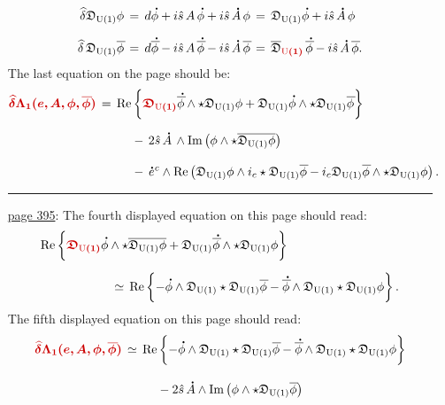 \documentclass[12pt]{GeomPhysBOOK}
\newcommand\mcorrect[1]{{\color{red!80!black}\bm{#1}}}
\newcommand\listrule{\vspace{0.2cm}\hrule height 0.3pt}
\begin{document}
\begin{enumerate}[leftmargin=1.9cm,labelwidth=1.4cm,itemsep=0.5cm]
\begin{align*}
			\delvar \GLD_{\text{U}(1)}\phi &\,=\, d\phidot + i\hat{s}\,A\,\phidot + i\hat{s}\,\Adot\,\phi \,=\, \GLD_{\text{U}(1)}\phidot + i\hat{s}\,\Adot\,\phi \\[0.2cm] 
			\delvar \,\GLD_{\text{U}(1)}\phibar &\,=\, d\phibardot - i\hat{s}\,A\,\phibardot - i\hat{s}\,\Adot\,\phibar \,=\, \overline{\GLD}_{\mcorrect{\text{U}(1)}}\,\phibardot - i\hat{s}\,\Adot\,\phibar.
		\end{align*}
		The last equation on the page should be:
		\begin{align*}
			\mcorrect{\delvar\Lambda_{1}(e,A,\phi,\phibar)} &\,=\, \text{Re}\left\{ \mcorrect{\GLD_{\text{U}(1)}}\phibardot \w \star\GLD_{\text{U}(1)}\phi + \GLD_{\text{U}(1)}\phidot \w \star \GLD_{\text{U}(1)}\phibar \right\} \\[0.2cm]
				&\hspace{1cm}-\, 2\hat{s}\,\Adot\,\w \text{Im}\left( \phi \w \star \overline{\GLD_{\text{U}(1)}\phi} \right) \\[0.3cm]
				&\hspace{1cm}-\, \varye{c} \w \text{Re}\left( \GLD_{\text{U}(1)}\phi \w i_{c}\star \GLD_{\text{U}(1)}\phibar  - i_{c}\GLD_{\text{U}(1)}\phibar \w \star \GLD_{\text{U}(1)}\phi\right). 
		\end{align*}
	\listrule
	\item[\underline{page 395}:]
		The fourth displayed equation on this page should read: 
		\begin{align*}
			&\text{Re}\left\{ \mcorrect{\GLD_{\text{U}(1)}}\phidot \w \star\overline{\GLD_{\text{U}(1)}\phi} + \GLD_{\text{U}(1)}\phibardot \w \star \GLD_{\text{U}(1)}\phi \right\} \\[0.2cm]
				&\hspace{2cm}\simeq\, \text{Re}\left\{ -\phidot \w \GLD_{\text{U}(1)}\star\GLD_{\text{U}(1)}\phibar - \phibardot \w \GLD_{\text{U}(1)} \star\GLD_{\text{U}(1)}\phi \right\}.
		\end{align*}
		The fifth displayed equation on this page should read: 
		\begin{align*}
			\mcorrect{\delvar\Lambda_{1}(e,A,\phi,\phibar)} &\,\simeq\, \text{Re}\left\{-\phidot \w \GLD_{\text{U}(1)}\star\GLD_{\text{U}(1)}\phibar - \phibardot \w \GLD_{\text{U}(1)}\star \GLD_{\text{U}(1)}\phi\right\} \\[0.3cm]
				&\hspace{1cm} - 2\hat{s}\,\Adot\w\text{Im}\left( \phi\w \star \GLD_{\text{U}(1)}\phibar\right) \\[0.3cm]

\end{align*}
\end{enumerate}
\end{document}
